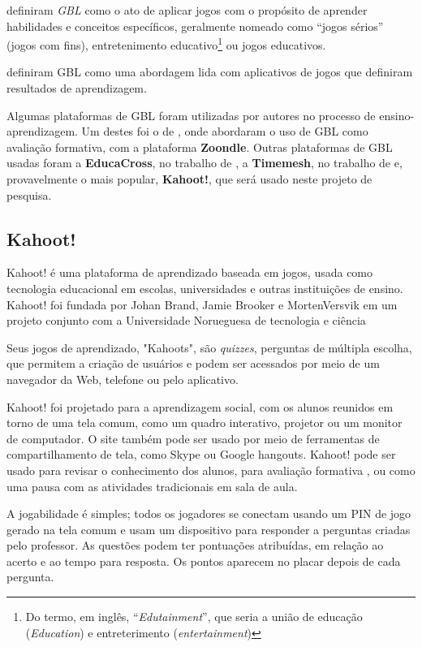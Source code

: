 \documentclass[
	12pt,				%
	openright,			%
	oneside,
	a4paper,			%
	english,			%
	french,				%
	spanish,			%
	brazil,				%
	]{abntex2}
\begin{document}
 definiram \textit{GBL} como o ato de aplicar jogos com o propósito de aprender habilidades e conceitos específicos, geralmente nomeado como “jogos sérios” (jogos com fins), entretenimento educativo\footnote{Do termo, em inglês, “\textit{Edutainment}”, que seria a união de educação (\textit{Education}) e entreterimento (\textit{entertainment})} ou jogos educativos.

 definiram GBL como uma abordagem lida com aplicativos de jogos que definiram resultados de aprendizagem.

Algumas plataformas de GBL foram utilizadas por autores no processo de ensino-aprendizagem. Um destes foi o de , onde abordaram o uso de GBL como avaliação formativa, com a plataforma \textbf{Zoondle}. Outras plataformas de GBL usadas foram a \textbf{EducaCross}, no trabalho de , a \textbf{Timemesh}, no trabalho de  e, provavelmente o mais popular, \textbf{Kahoot!}, que será usado neste projeto de pesquisa.

\subsection{Kahoot!}
\label{sec:Kahoot!}
Kahoot! é uma plataforma de aprendizado baseada em jogos, usada como tecnologia educacional em escolas, universidades e outras instituições de ensino. Kahoot! foi fundada por Johan Brand, Jamie Brooker e MortenVersvik em um projeto conjunto com a Universidade Norueguesa de tecnologia e ciência \cite{kahoot2018}

Seus jogos de aprendizado, "Kahoots", são \textit{quizzes}, perguntas de múltipla escolha, que permitem a criação de usuários e podem ser acessados por meio de um navegador da Web, telefone ou pelo aplicativo.

Kahoot! foi projetado para a aprendizagem social, com os alunos reunidos em torno de uma tela comum, como um quadro interativo, projetor ou um monitor de computador. O site também pode ser usado por meio de ferramentas de compartilhamento de tela, como Skype ou Google hangouts. Kahoot! pode ser usado para revisar o conhecimento dos alunos, para avaliação formativa \cite{kahootFormative}, ou como uma pausa com as atividades tradicionais em sala de aula. 

A jogabilidade é simples; todos os jogadores se conectam usando um PIN de jogo gerado na tela comum e usam um dispositivo para responder a perguntas criadas pelo professor. As questões podem ter pontuações atribuídas, em relação ao acerto e ao tempo para resposta. Os pontos aparecem no placar depois de cada pergunta.
\end{document}

